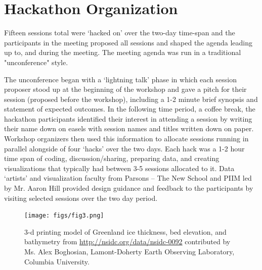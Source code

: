 \documentclass[11pt]{article}
\begin{document}

\section{Hackathon Organization}
Fifteen sessions total were `hacked on' over the two-day time-span and the participants in the meeting proposed all sessions and shaped the agenda leading up to, and during the meeting. The meeting agenda was run in a traditional "unconference" style. 

The unconference began with a `lightning talk' phase in which each session proposer stood up at the beginning of the workshop and gave a pitch for their session (proposed before the workshop), including a 1-2 minute brief synopsis and statement of expected outcomes. In the following time period, a coffee break, the hackathon participants identified their interest in attending a session by writing their name down on easels with session names and titles written down on paper. Workshop organizers then used this information to allocate sessions running in parallel alongside of four `hacks' over the two days. Each hack was a 1-2 hour time span of coding, discussion/sharing, preparing data, and creating visualizations that typically had between 3-5 sessions allocated to it. Data `artists' and visualization faculty from Parsons -- The New School and PIIM led by Mr. Aaron Hill provided design guidance and feedback to the participants by visiting selected sessions over the two day period.

\begin{figure}[htp]
    \centering
    \texttt{[image: figs/fig3.png]}
    \caption{3-d printing model of Greenland ice thickness, bed elevation, and bathymetry from \protect\url{http://nsidc.org/data/nsidc-0092} contributed by Ms. Alex Boghosian, Lamont-Doherty Earth Observing Laboratory, Columbia University.}
    \label{fig:website}
\end{figure}
\end{document}
